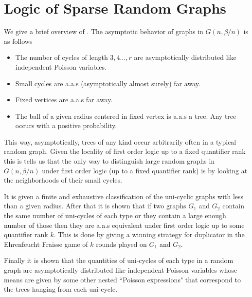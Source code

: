 \documentclass[11pt,notitlepage,a4paper]{article}
\theoremstyle{definition}
\begin{document}
\clearpage




\section{Logic of Sparse Random Graphs}

We give a brief overview of \cite{lynch1992probabilities}.
The asymptotic behavior of graphs in $G(n,\beta/n)$ is as follows
	\begin{itemize}
	\item The number of cycles of 
	length $3,4\dots, r$
	are asymptotically distributed like independent Poisson 
	variables.
	\item Small cycles are a.a.s (asymptotically almost surely) far away.
	\item Fixed vertices are a.a.s far away.
	\item The ball of a given radius centered in fixed
	vertex is a.a.s a tree. Any tree occurs with a positive 
	probability.
\end{itemize}

This way, asymptotically, trees of any kind occur arbitrarily often in a typical
random graph. Given the locality of first order logic up to a fixed 
quantifier rank this is tells us that the only way 
to distinguish large random graphs in $G(n,\beta/n)$ under first order logic
(up to a fixed quantifier rank) 
is by looking at the neighborhoods of their small cycles. \par

It is given a finite and exhaustive classification of the uni-cyclic
graphs with less than a given radius. After that it is shown that
if two graphs $G_1$ and $G_2$ contain the same number 
of uni-cycles of each type or they
contain a large enough number of those then they are a.a.s equivalent
under first order logic up to some quantifier rank $k$. This is done by giving
a winning strategy for duplicator in the Ehrenfeucht Fraisse game of $k$ rounds played on 
$G_1$ and $G_2$.\par

Finally it is shown that the quantities of uni-cycles of each type in a random graph
are asymptotically distributed like independent Poisson variables 
whose means are given by some other nested ``Poisson expressions" that correspond 
to the trees hanging from each uni-cycle. 
\end{document}
